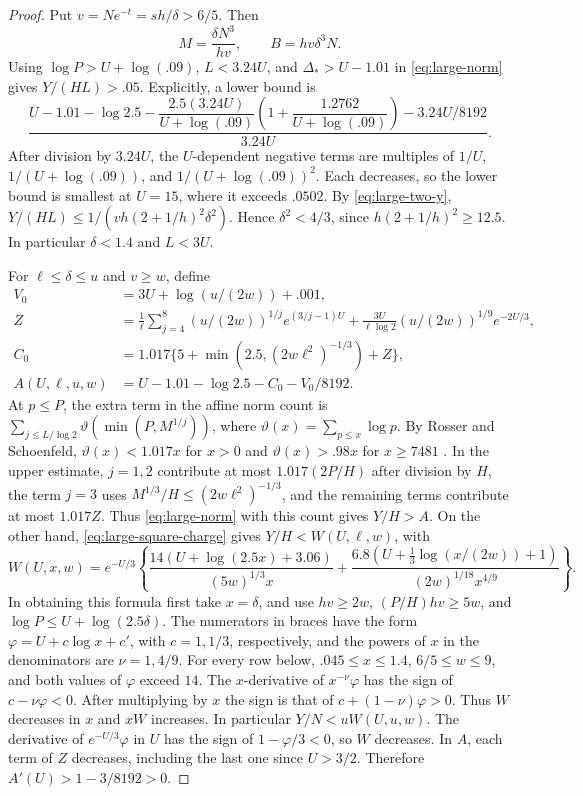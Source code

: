 \begin{proof}
Put \(v=N e^{-t}=sh/\delta>6/5\). Then
\[
 M=\frac{\delta N^3}{hv},\qquad B=hv\delta^3N .
\]
Using \(\log P>U+\log(.09)\), \(L<3.24U\),
and \(\Delta_*>U-1.01\) in \eqref{eq:large-norm}
gives \(Y/(HL)>.05\). Explicitly, a lower bound is
\[
 \frac{U-1.01-\log2.5-
       \dfrac{2.5(3.24U)}{U+\log(.09)}
          \left(1+\dfrac{1.2762}{U+\log(.09)}\right)
       -3.24U/8192}{3.24U}.
\]
After division by \(3.24U\), the \(U\)-dependent negative
terms are multiples of \(1/U\), \(1/(U+\log(.09))\), and
\(1/(U+\log(.09))^2\). Each decreases, so the lower bound
is smallest at \(U=15\), where it exceeds \(.0502\).
By \eqref{eq:large-two-y},
\(Y/(HL)\le 1/(v h(2+1/h)^2\delta^2)\). Hence
\(\delta^2<4/3\), since \(h(2+1/h)^2\ge12.5\).
In particular \(\delta<1.4\) and \(L<3U\).

For \(\ell\le\delta\le u\) and \(v\ge w\), define
\[
\begin{aligned}
 V_0&=3U+\log(u/(2w))+.001,\\
 Z&=\frac1\ell\sum_{j=4}^8(u/(2w))^{1/j}e^{(3/j-1)U}
       +\frac{3U}{\ell\log2}(u/(2w))^{1/9}e^{-2U/3},\\
 C_0&=1.017\{5+\min(2.5,(2w\ell^2)^{-1/3})+Z\},\\
 A(U,\ell,u,w)&=U-1.01-\log2.5-C_0-V_0/8192 .
\end{aligned}
\]
At \(p\le P\), the extra term in the affine norm count is
\(\sum_{j\le L/\log2}\vartheta(\min(P,M^{1/j}))\), where
\(\vartheta(x)=\sum_{p\le x}\log p\).
By Rosser and Schoenfeld,
\(\vartheta(x)<1.017x\) for \(x>0\) and
\(\vartheta(x)>.98x\) for \(x\ge7481\)
\cite[Theorems 9 and 10]{rosser-schoenfeld}.
In the upper estimate, \(j=1,2\) contribute at most
\(1.017(2P/H)\) after division by \(H\), the term \(j=3\)
uses \(M^{1/3}/H\le(2w\ell^2)^{-1/3}\), and the remaining
terms contribute at most \(1.017Z\).
Thus \eqref{eq:large-norm} with this count gives \(Y/H>A\).
On the other hand, \eqref{eq:large-square-charge} gives
\(Y/H<W(U,\ell,w)\), with
\[
 W(U,x,w)=e^{-U/3}\left\{
 \frac{14(U+\log(2.5x)+3.06)}{(5w)^{1/3}x}
 +\frac{6.8(U+\tfrac13\log(x/(2w))+1)}{(2w)^{1/18}x^{4/9}}
 \right\}.
\]
In obtaining this formula first take \(x=\delta\), and use
\(hv\ge2w\), \((P/H)hv\ge5w\), and
\(\log P\le U+\log(2.5\delta)\).
The numerators in braces have the form
\(\varphi=U+c\log x+c'\), with \(c=1,1/3\), respectively,
and the powers of \(x\) in the denominators are
\(\nu=1,4/9\). For every row below,
\(.045\le x\le1.4\), \(6/5\le w\le9\), and both values
of \(\varphi\) exceed \(14\).
The \(x\)-derivative of \(x^{-\nu}\varphi\) has the sign
of \(c-\nu\varphi<0\). After multiplying by \(x\) the sign
is that of \(c+(1-\nu)\varphi>0\).
Thus \(W\) decreases in \(x\) and \(xW\) increases.
In particular \(Y/N<uW(U,u,w)\).
The derivative of \(e^{-U/3}\varphi\) in \(U\)
has the sign of \(1-\varphi/3<0\), so \(W\) decreases.
In \(A\), each term of \(Z\) decreases, including the last
one since \(U>3/2\). Therefore \(A'(U)>1-3/8192>0\).


\end{proof}
